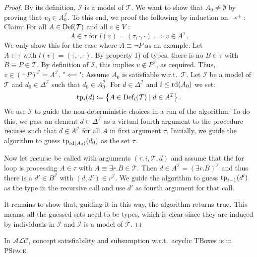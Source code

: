 \begin{proof}
	By its definition, $\mathcal{I}$ is a model of $\mathcal{T}$.
	We want to show that $A_0 \neq \emptyset$ by proving that $v_0 \in A_0^\mathcal{I}$.
	To this end, we proof the following by induction on $\prec^+$:
	Claim: For all  $A \in \operatorname{\text{Def}}(\mathcal{T})$ and all $v \in V$ :
	\[
		A \in \tau \text{ for } l(v) = (\tau, \cdot, \cdot) \implies v \in A^{\mathcal{I}}
	.\]
	We only show this for the case where $A \equiv \neg P$ as an example.
	Let $A \in \tau \text{ with } l(v) = (\tau, \cdot, \cdot)$.
	By property 1) of types, there is no $B \in \tau$ with $B \equiv P \in \mathcal{T}$.
	By definition of $\mathcal{I}$, this implies $v \notin P^\mathcal{I}$, as required.
	Thus, $v \in (\neg P)^\mathcal{I} = A^\mathcal{I}$.
	\newline
	"$ \impliedby$":
	Assume $A_0$ is satisfiable w.r.t.\ $\mathcal{T}$.
	Let $\mathcal{I}$ be a model of $\mathcal{T}$ and $d_0 \in \Delta^\mathcal{I}$
	such that $d_0 \in A_0^\mathcal{I}$.
	For $d \in \Delta^\mathcal{I}$ and $i \leq \operatorname{\text{rd}}(A_0)$ we set:
	\[
		\operatorname{\text{tp}}_i(d) \coloneqq \left\{ A \in \operatorname{\text{Def}}_i(\mathcal{T}) \mid d \in A^\mathcal{I} \right\}
	.\]
	We use $\mathcal{I}$ to guide the non-deterministic choices in a run of the algorithm.
	To do this, we pass an element $d \in \Delta^\mathcal{I}$ as a virtual fourth argument
	to the procedure $\operatorname{\text{recurse}}$ such that $d \in A^\mathcal{I}$ for all $A$ in first argument $\tau$.
	Initially, we guide the algorithm to guess $\operatorname{\text{tp}}_{\operatorname{\text{rd}}(A_0)}(d_0)$ as the set $\tau$.

	Now let $\operatorname{\text{recurse}}$ be called with arguments $\left( \tau, i, \mathcal{T}, d \right)$
	and assume that the for loop is processing $A \in \tau$ with $A \equiv \exists r.B \in \mathcal{T}$.
	Then $d \in A^\mathcal{I} = (\exists r.B)^\mathcal{I}$ and thus there is a $d' \in B^\mathcal{I}$ with $(d,d') \in r^\mathcal{I}$.
	We guide the algorithm to guess $\operatorname{\text{tp}}_{i-1}(d')$ as the type in the recursive call
	and use $d'$ as fourth argument for that call.

	It remains to show that, guiding it in this way, the algorithm returns $\mathit{\text{true}}$.
	This means, all the guessed sets need to be types,
	which is clear since they are induced by individuals in $\mathcal{I}$ and $\mathcal{I}$ is a model of $\mathcal{T}$.
\end{proof}

\begin{theorem}
	In $\mathcal{ALC}$, concept satisfiability and subsumption w.r.t.\ acyclic TBoxes is in \textsc{PSpace}.
\end{theorem}

